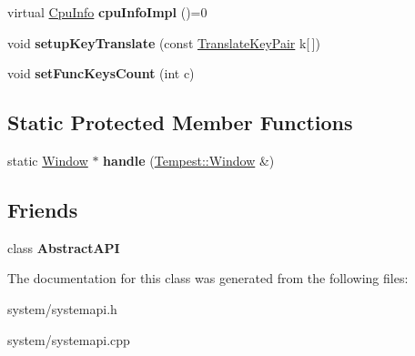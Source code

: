 \begin{DoxyCompactItemize}
\item 
\hypertarget{class_tempest_1_1_system_a_p_i_aa10436e21117556e402c877333f004d3}{virtual \hyperlink{struct_tempest_1_1_system_a_p_i_1_1_cpu_info}{Cpu\+Info} {\bfseries cpu\+Info\+Impl} ()=0}\label{class_tempest_1_1_system_a_p_i_aa10436e21117556e402c877333f004d3}

\item 
\hypertarget{class_tempest_1_1_system_a_p_i_a0a41a727e9b551843de7281a98bf7cc3}{void {\bfseries setup\+Key\+Translate} (const \hyperlink{struct_tempest_1_1_system_a_p_i_1_1_translate_key_pair}{Translate\+Key\+Pair} k\mbox{[}$\,$\mbox{]})}\label{class_tempest_1_1_system_a_p_i_a0a41a727e9b551843de7281a98bf7cc3}

\item 
\hypertarget{class_tempest_1_1_system_a_p_i_ac0bf4defb32a2fb4d40872f50fca0a22}{void {\bfseries set\+Func\+Keys\+Count} (int c)}\label{class_tempest_1_1_system_a_p_i_ac0bf4defb32a2fb4d40872f50fca0a22}

\end{DoxyCompactItemize}
\subsection*{Static Protected Member Functions}
\begin{DoxyCompactItemize}
\item 
\hypertarget{class_tempest_1_1_system_a_p_i_ab780780256d605ebffa56330743648d3}{static \hyperlink{class_tempest_1_1_window}{Window} $\ast$ {\bfseries handle} (\hyperlink{class_tempest_1_1_window}{Tempest\+::\+Window} \&)}\label{class_tempest_1_1_system_a_p_i_ab780780256d605ebffa56330743648d3}

\end{DoxyCompactItemize}
\subsection*{Friends}
\begin{DoxyCompactItemize}
\item 
\hypertarget{class_tempest_1_1_system_a_p_i_a1be608e02c29daf3345d15d5398b941a}{class {\bfseries Abstract\+A\+P\+I}}\label{class_tempest_1_1_system_a_p_i_a1be608e02c29daf3345d15d5398b941a}

\end{DoxyCompactItemize}


The documentation for this class was generated from the following files\+:\begin{DoxyCompactItemize}
\item 
system/systemapi.\+h\item 
system/systemapi.\+cpp\end{DoxyCompactItemize}
